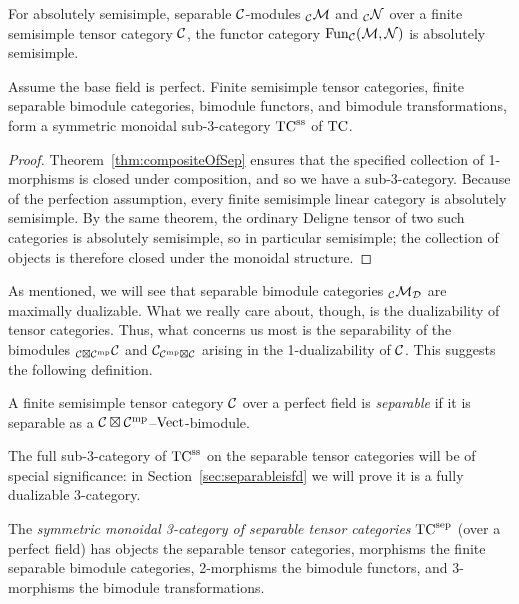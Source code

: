 \documentclass{amsart}
\begin{document}
\begin{corollary} \label{cor:funsemi}
For absolutely semisimple, separable $\mathcal C$-modules ${}_\mathcal C \mathcal M$ and ${}_\mathcal C \mathcal N$ over a finite semisimple tensor category $\mathcal C$, the functor category $\operatorname{Fun}_{\mathcal C}(\mathcal M,\mathcal N)$ is absolutely semisimple.
\end{corollary}

\begin{corollary} \label{cor:septc}
Assume the base field is perfect.  Finite semisimple tensor categories, finite separable bimodule categories, bimodule functors, and bimodule transformations, form a symmetric monoidal sub-3-category ${\mathrm{TC}^{\mathrm{ss}}}$ of $\mathrm{TC}$.
\end{corollary}
\begin{proof}
Theorem~\ref{thm:compositeOfSep} ensures that the specified collection of 1-morphisms is closed under composition, and so we have a sub-3-category.  Because of the perfection assumption, every finite semisimple linear category is absolutely semisimple.  By the same theorem, the ordinary Deligne tensor of two such categories is absolutely semisimple, so in particular semisimple; the collection of objects is therefore closed under the monoidal structure.  
\end{proof}


As mentioned, we will see that separable bimodule categories ${}_\mathcal C \mathcal M_\mathcal D$ are maximally dualizable.  What we really care about, though, is the dualizability of tensor categories.  Thus, what concerns us most is the separability of the bimodules ${}_{\mathcal C \boxtimes \mathcal C^{\mathrm{mp}}} \mathcal C$ and $\mathcal C_{\mathcal C^{\mathrm{mp}} \boxtimes \mathcal C}$ arising in the 1-dualizability of $\mathcal C$.  This suggests the following definition.
\begin{definition}
A finite semisimple tensor category $\mathcal C$ over a perfect field is \emph{separable} if it is separable as a $\mathcal C \boxtimes \mathcal C^{\mathrm{mp}}$--$\mathrm{Vect}$-bimodule.
\end{definition}
\nid The full sub-3-category of ${\mathrm{TC}^{\mathrm{ss}}}$ on the separable tensor categories will be of special significance: in Section~\ref{sec:separableisfd} we will prove it is a fully dualizable 3-category.  %
\begin{definition}
The \emph{symmetric monoidal 3-category of separable tensor categories} ${\mathrm{TC}^{\mathrm{sep}}}$ (over a perfect field) has objects the separable tensor categories, morphisms the finite separable bimodule categories, 2-morphisms the bimodule functors, and 3-morphisms the bimodule transformations.
\end{definition}
\end{document}
